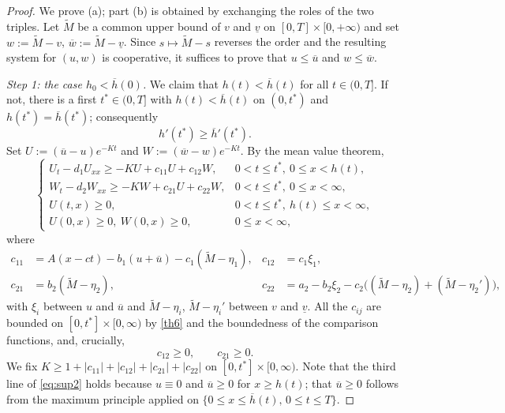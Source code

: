 \documentclass[reqno]{amsart}
\theoremstyle{plain}
\theoremstyle{definition}
\theoremstyle{remark}
\begin{document}
\begin{proof}
	We prove (a); part (b) is obtained by exchanging the roles of the two triples.
	Let $\tilde{M}$ be a common upper bound of $v$ and $\underline{v}$ on
	$[0,T]\times[0,+\infty)$ and set $w:=\tilde{M}-v$, $\overline{w} :=
	\tilde{M}-\underline{v}$. Since $s\mapsto \tilde M-s$ reverses the order and
	the resulting system for $(u,w)$ is cooperative, it suffices to prove that
	$u\le\overline u$ and $w\le\overline w$.

	\textit{Step 1: the case $h_0<\overline h(0)$.} We claim that
	$h(t)<\overline{h}(t)$ for all $t\in(0,T]$. If not, there is a first
	$t^*\in(0,T]$ with $h(t)<\overline{h}(t)$ on $(0,t^*)$ and
	$h(t^*)=\overline{h}(t^*)$; consequently
	\begin{equation}\label{eq:h}
		h'(t^*) \ge \overline{h}'(t^*).
	\end{equation}
	Set $U := (\overline{u} - u)e^{-Kt}$ and $W := (\overline{w} - w)e^{-Kt}$. By
	the mean value theorem,
	\begin{equation}\label{eq:sup2}
		\begin{cases}
			U_t - d_1 U_{xx} \ge -KU + c_{11}U + c_{12}W, & 0 < t \le t^*, ~ 0 \le x < h(t), \\
			W_t - d_2 W_{xx} \ge -KW + c_{21}U + c_{22}W, & 0 < t \le t^*, ~ 0 \le x < \infty, \\
			U(t,x) \ge 0, & 0 < t \le t^*, ~ h(t) \le x < \infty, \\
			U(0,x) \ge 0, ~ W(0,x) \ge 0, & 0 \le x < \infty,
		\end{cases}
	\end{equation}
	where
	\begin{align*}
		c_{11} &= A(x-ct) - b_1 (u+\overline u) - c_1 (\tilde{M} - \eta_1), & c_{12} &= c_1 \xi_1, \\
		c_{21} &= b_2 (\tilde{M} - \eta_2), & c_{22} &= a_2 - b_2 \xi_2 - c_2\big((\tilde M-\eta_2)+(\tilde M-\eta_2')\big),
	\end{align*}
	with $\xi_i$ between $u$ and $\overline{u}$ and $\tilde{M}-\eta_i$,
	$\tilde M-\eta_i'$ between $v$ and $\underline{v}$. All the $c_{ij}$ are
	bounded on $[0,t^*]\times[0,\infty)$ by \cref{th6} and the boundedness of the
	comparison functions, and, crucially,
	\begin{equation}\label{eq:coop}
		c_{12}\ge0,\qquad c_{21}\ge0 .
	\end{equation}
	We fix $K\ge 1+|c_{11}|+|c_{12}|+|c_{21}|+|c_{22}|$ on
	$[0,t^*]\times[0,\infty)$. Note that the third line of \eqref{eq:sup2} holds
	because $u\equiv0$ and $\overline u\ge0$ for $x\ge h(t)$; that $\overline u\ge0$
	follows from the maximum principle applied on
	$\{0\le x\le\overline h(t),\,0\le t\le T\}$.


\end{proof}
\end{document}
